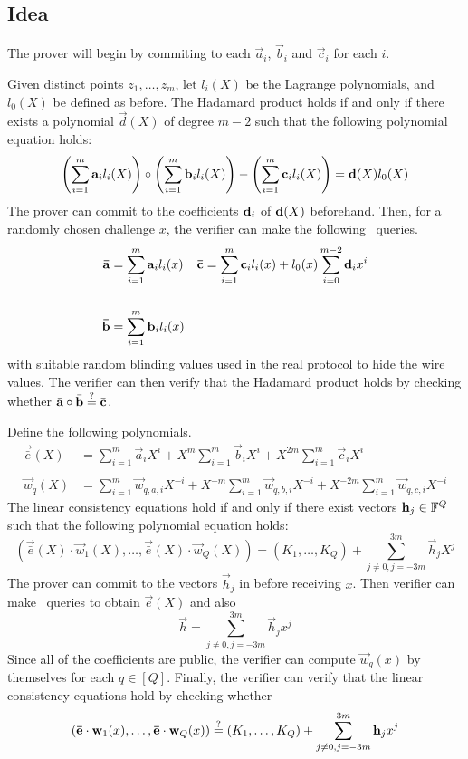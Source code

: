 \subsection{Idea}

The prover will begin by commiting to each $\vec{a}_{i}$, $\vec{b}_i$ and $\vec{c}_i$ for each $i$.

Given distinct points $z_1,\ldots,z_m$, let $l_i(X)$ be the Lagrange polynomials, and $l_0(X)$ be defined as before. The Hadamard product holds if and only if there exists a polynomial $\vec{d}(X)$ of degree $m-2$ such that the following polynomial equation holds:
\begin{align*}
\left( \sum_{i=1}^m \mathbf{a}_i l_i(X) \right) \circ \left( \sum_{i=1}^m \mathbf{b}_i l_i(X) \right) - \left( \sum_{i=1}^m \mathbf{c}_{i} l_i(X) \right) = \mathbf{d}(X) l_0(X)
\end{align*}
 The prover can commit to the coefficients $\mathbf{d}_i$ of $\mathbf{d}(X)$ beforehand. Then, for a randomly chosen challenge $x$, the verifier can make the following \ILC\ queries.
\begin{align*}
\mathbf{\bar{a}} &= \sum_{i=1}^m \mathbf{a}_{i} l_i(x) && \mathbf{\bar{c}} = \sum_{i=1}^m \mathbf{c}_{i} l_i(x) + l_0(x) \sum_{i=0}^{m-2} \mathbf{d}_i x^i \\ \\
\mathbf{\bar{b}} &= \sum_{i=1}^m \mathbf{b}_{i} l_i(x) &
\end{align*}
with suitable random blinding values used in the real protocol to hide the wire values. The verifier can then verify that the Hadamard product holds by checking whether $\bar{\mathbf{a}} \circ \bar{\mathbf{b}} \overset{?}{=} \bar{\mathbf{c}}$.

Define the following polynomials.
\begin{align*}
\vec{\bar{e}}(X) &= \sum_{i=1}^m \vec{a}_i X^i + X^m \sum_{i=1}^m \vec{b}_{i} X^i + X^{2m} \sum_{i=1}^m \vec{c}_{i} X^i \\ \\
\vec{w}_q(X) &= \sum_{i=1}^m \vec{w}_{q,a,i} X^{-i} + X^{-m} \sum_{i=1}^m \vec{w}_{q,b,i} X^{-i} + X^{-2m} \sum_{i=1}^m \vec{w}_{q,c,i} X^{-i}
\end{align*}
The linear consistency equations hold if and only if there exist vectors $\mathbf{h}_j \in \mathbb{F}^Q$ such that the following polynomial equation holds:
\[
( \vec{\bar{e}}(X) \cdot \vec{w}_1(X),\ldots, \vec{\bar{e}}(X)\cdot \vec{w}_Q(X) )  = (K_1,\ldots,K_Q) + \sum_{j\neq 0, j=-3m}^{3m} \vec{h}_j {X^j}
\]
The prover can commit to the vectors $\vec{h}_j$ in before receiving $x$. Then verifier can make \ILC \ queries to obtain $\vec{e}(X)$ and also
\[
\vec{h} = \sum_{j\neq 0, j=-3m}^{3m} \vec{h}_j {x^j}
\]
Since all of the coefficients are public, the verifier can compute $\vec{w}_q(x)$ by themselves for each $q \in [Q]$. Finally, the verifier can verify that the linear consistency equations hold by checking whether
\[
( \mathbf{\bar{e}}\cdot \mathbf{w}_1(x),\ldots, \mathbf{\bar{e}}\cdot \mathbf{w}_Q(x) ) \overset{?}{=} (K_1,\ldots,K_Q) + \sum_{j\neq 0, j=-3m}^{3m} \mathbf{h}_j {x^j}
\]

